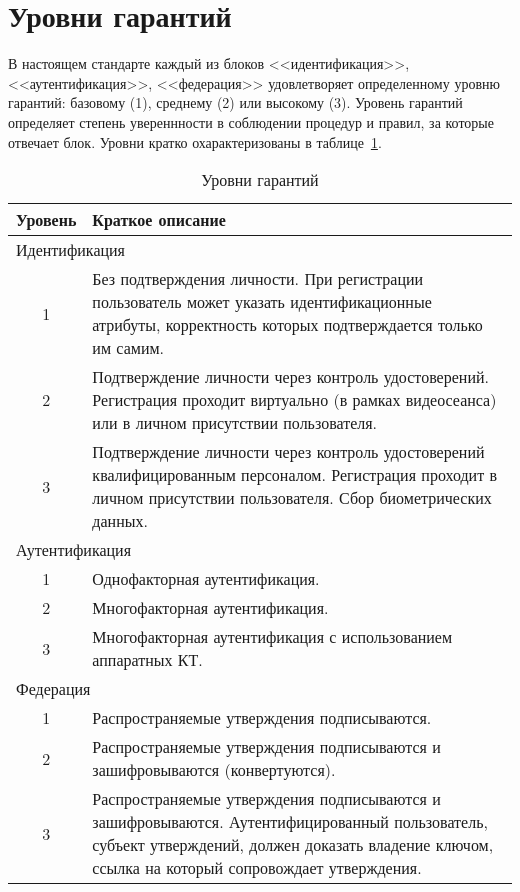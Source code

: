 \section{Уровни гарантий}\label{COMMON.Levels}

В настоящем стандарте каждый из блоков <<идентификация>>, <<аутентификация>>, 
<<федерация>> удовлетворяет определенному уровню гарантий: базовому (1), 
среднему (2) или высокому (3).
%
Уровень гарантий определяет степень увереннности в соблюдении процедур и
правил, за которые отвечает блок. 
%
Уровни кратко охарактеризованы в таблице~\ref{Table.COMMON.AL}. 

\begin{table}[hbt]
\caption{Уровни гарантий}\label{Table.COMMON.AL}
\begin{tabular}{|c|p{14cm}|}
\hline
Уровень & Краткое описание\\
\hline
\hline
\multicolumn{2}{|l|}{Идентификация}\\
\hline
\hline
%
1 & Без подтверждения личности. При регистрации пользователь может
указать идентификационные атрибуты, корректность которых подтверждается 
только им самим.\\ 
\hline
%
2 & Подтверждение личности через контроль удостоверений.
Регистрация проходит виртуально (в рамках видеосеанса) или в личном присутствии 
пользователя.\\
\hline
%
3 & Подтверждение личности через контроль удостоверений квалифицированным 
персоналом. Регистрация проходит в личном присутствии пользователя.
Сбор биометрических данных.\\
%
\hline
\hline
\multicolumn{2}{|l|}{Аутентификация}\\
\hline
\hline
%
1 & Однофакторная аутентификация.\\
\hline
%
2 & Многофакторная аутентификация.\\
\hline
%
3 & Многофакторная аутентификация с использованием аппаратных КТ.\\
%
\hline
\hline
\multicolumn{2}{|l|}{Федерация}\\
\hline
\hline
%
1 & Распространяемые утверждения подписываются.\\
\hline
%
2 & Распространяемые утверждения подписываются и зашифровываются 
(конвертуются).\\
\hline
%
3 & Распространяемые утверждения подписываются и зашифровываются.
Аутентифицированный пользователь, субъект утверждений, должен доказать владение 
ключом, ссылка на который сопровождает утверждения.\\ 
\hline
\end{tabular}
\end{table}


